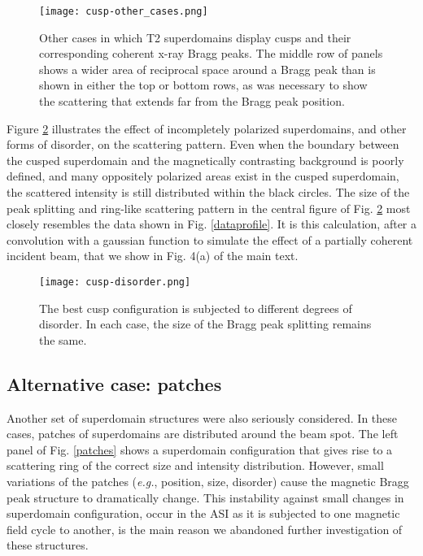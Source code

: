 \documentclass[aps, prb, reprint, showpacs, superscriptaddress]{revtex4-1}
\begin{document}
\begin{figure}[ht]
\begin{center}
\texttt{[image: cusp-other\_cases.png]}
\caption {
Other cases in which T2 superdomains display cusps and their corresponding coherent x-ray Bragg peaks.
The middle row of panels shows a wider area of reciprocal space around a Bragg peak than is shown in either the top or bottom rows, as was necessary to show the scattering that extends far from the Bragg peak position.
}  \label{cuspother}
\end{center}
\end{figure}

Figure \ref{cuspdisorder} illustrates the effect of incompletely polarized superdomains, and other forms of disorder, on the scattering pattern. 
Even when the boundary between the cusped superdomain and the magnetically contrasting background is poorly defined, and many oppositely polarized areas exist in the cusped superdomain, the scattered intensity is still distributed within the black circles.
The size of the peak splitting and ring-like scattering pattern in the central figure of Fig. \ref{cuspdisorder} most closely resembles the data shown in Fig. \ref{dataprofile}.
It is this calculation, after a convolution with a gaussian function to simulate the effect of a partially coherent incident beam, that we show in Fig. 4(a) of the main text.

\begin{figure}[hbt]
\begin{center}
\texttt{[image: cusp-disorder.png]}
\caption {
The best cusp configuration is subjected to different degrees of disorder.
In each case, the size of the Bragg peak splitting remains the same.
}  \label{cuspdisorder}
\end{center}
\end{figure}

	\subsection{Alternative case: patches}

Another set of superdomain structures were also seriously considered.
In these cases, patches of superdomains are distributed around the beam spot.
The left panel of Fig. \ref{patches} shows a superdomain configuration that gives rise to a scattering ring of the correct size and intensity distribution.
However, small variations of the patches (\textit{e.g.}, position, size, disorder) cause the magnetic Bragg peak structure to dramatically change.
This instability against small changes in superdomain configuration, occur in the ASI as it is subjected to one magnetic field cycle to another, is the main reason we abandoned further investigation of these structures.
\end{document}
